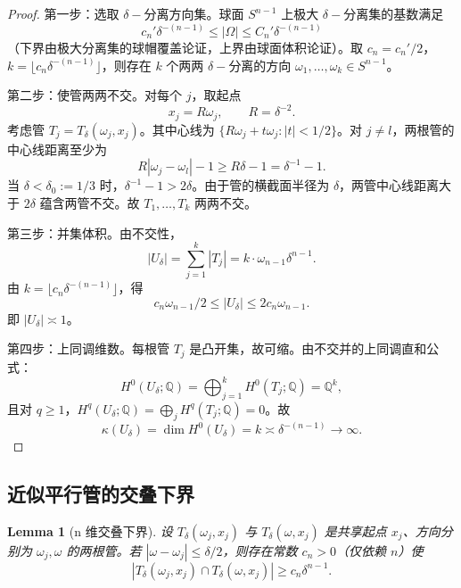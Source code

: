 \documentclass[11pt,a4paper]{article}
\newtheorem{lemma}[theorem]{Lemma}
\theoremstyle{remark}
\begin{document}
		\begin{proof}
		第一步：选取 $\delta-$分离方向集。球面 $S^{n-1}$ 上极大 $\delta-$分离集的基数满足
		\[
		c_n'\delta^{-(n-1)}\le|\Omega|\le C_n'\delta^{-(n-1)}
		\]
		（下界由极大分离集的球帽覆盖论证，上界由球面体积论证）。取 $c_n=c_n'/2$，$k=\lfloor c_n\delta^{-(n-1)}\rfloor$，则存在 $k$ 个两两 $\delta-$分离的方向 $\omega_1,\ldots,\omega_k\in S^{n-1}$。
		
		第二步：使管两两不交。对每个 $j$，取起点
		\[
		x_j=R\omega_j,\qquad R=\delta^{-2}.
		\]
		考虑管 $T_j=T_\delta(\omega_j,x_j)$。其中心线为 $\{R\omega_j+t\omega_j:|t|<1/2\}$。对 $j\neq l$，两根管的中心线距离至少为
		\[
		R|\omega_j-\omega_l|-1\ge R\delta-1=\delta^{-1}-1.
		\]
		当 $\delta<\delta_0:=1/3$ 时，$\delta^{-1}-1>2\delta$。由于管的横截面半径为 $\delta$，两管中心线距离大于 $2\delta$ 蕴含两管不交。故 $T_1,\ldots,T_k$ 两两不交。
		
		第三步：并集体积。由不交性，
		\[
		|U_\delta|=\sum_{j=1}^k|T_j|=k\cdot\omega_{n-1}\delta^{n-1}.
		\]
		由 $k=\lfloor c_n\delta^{-(n-1)}\rfloor$，得
		\[
		c_n\omega_{n-1}/2\le|U_\delta|\le 2c_n\omega_{n-1}.
		\]
		即 $|U_\delta|\asymp1$。
		
		第四步：上同调维数。每根管 $T_j$ 是凸开集，故可缩。由不交并的上同调直和公式：
		\[
		H^0(U_\delta;\mathbb Q)=\bigoplus_{j=1}^kH^0(T_j;\mathbb Q)=\mathbb Q^k,
		\]
		且对 $q\ge1$，$H^q(U_\delta;\mathbb Q)=\bigoplus_jH^q(T_j;\mathbb Q)=0$。故
		\[
		\kappa(U_\delta)=\dim H^0(U_\delta)=k\asymp\delta^{-(n-1)}\to\infty.
		\]
		\end{proof}
		
		\subsection{近似平行管的交叠下界}
		\begin{lemma}[n 维交叠下界]
		设 $T_\delta(\omega_j,x_j)$ 与 $T_\delta(\omega,x_j)$ 是共享起点 $x_j$、方向分别为 $\omega_j,\omega$ 的两根管。若 $|\omega-\omega_j|\le\delta/2$，则存在常数 $c_n>0$（仅依赖 $n$）使
		\[
		|T_\delta(\omega_j,x_j)\cap T_\delta(\omega,x_j)|\ge c_n\delta^{n-1}.
		\]
		\end{lemma}
		
\end{document}
